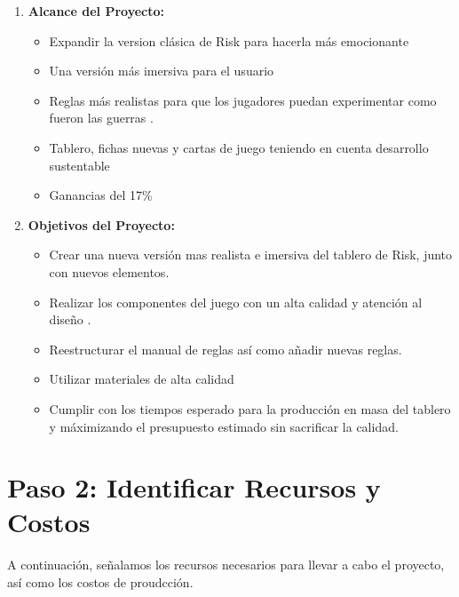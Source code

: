 \documentclass[12pt]{article}
\begin{document}
\begin{enumerate}
	\item \textbf{Alcance del Proyecto:} 

	\begin{itemize}
		\item Expandir la version clásica de Risk para hacerla más emocionante

		\item Una versión más imersiva para el usuario

		\item Reglas más realistas para que los jugadores puedan experimentar como fueron las guerras
		.
		\item Tablero, fichas nuevas y cartas de juego teniendo en cuenta desarrollo sustentable

		\item Ganancias del 17\%

	\end{itemize}

	\item \textbf{Objetivos del Proyecto:}

	\begin{itemize}
		\item Crear una nueva versión mas realista e imersiva del tablero de Risk, junto con nuevos elementos.

		\item Realizar los componentes del juego con un alta calidad y atención al diseño
		.
		\item Reestructurar el manual de reglas así como añadir nuevas reglas.

		\item Utilizar materiales de alta calidad

		\item Cumplir con los tiempos esperado para la producción en masa del tablero y máximizando el presupuesto estimado sin sacrificar la calidad.

	\end{itemize}

\end{enumerate}


 \section*{Paso 2: Identificar Recursos y Costos}


A continuación, señalamos los recursos necesarios para llevar a cabo el proyecto, así como los costos de proudcción.
\end{document}

